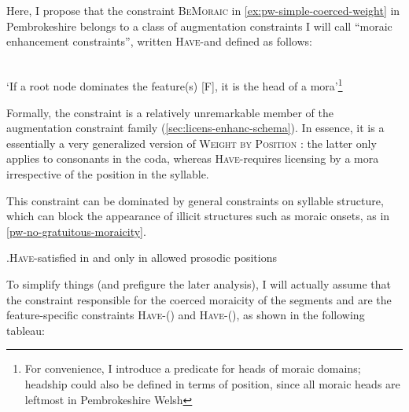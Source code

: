 Here, I propose that the constraint \textsc{BeMoraic} in \cref{ex:pw-simple-coerced-weight} in Pembrokeshire belongs to a class of augmentation constraints I will call \enquote{moraic enhancement constraints}, written \textsc{Have}-\mo[F] and defined as follows:

\begin{constraint}
  \label{def:have-m}
  \\
  `If a root node dominates the feature(s) [F], it is the head of a mora'\footnote{For convenience, I introduce a predicate for heads of moraic domains; headship could also be defined in terms of position, since all moraic heads are leftmost in Pembrokeshire Welsh}
\end{constraint}


Formally, the constraint is a relatively unremarkable member of the augmentation constraint family (\cref{sec:licens-enhanc-schema}). In essence, it is a essentially a very generalized version of \textsc{Weight by Position} \citep{hayes89:_compen_lengt_moraic_phonol,goldsmith90:_autos,archangeli91:_syllab_yawel,zec95,broselow97:_syllab,rosenthall99:_weigh_posit_posit,moren01:_distin}: the latter only applies to consonants in the coda, whereas \textsc{Have}-\mo requires licensing by a mora irrespective of the position in the syllable.

This constraint can be dominated by general constraints on syllable structure, which can block the appearance of illicit structures such as moraic onsets, as in \ref{pw-no-gratuitous-moraicity}.

\ex.\label{pw-no-gratuitous-moraicity}\textsc{Have}-\mo[C] satisfied in and only in allowed prosodic positions\\
\begin{OTtableau}{3}
\end{OTtableau}

To simplify things (and prefigure the later analysis), I will actually assume that the constraint responsible for the coerced moraicity of the segments \ipa{[m]} and \ipa{[ŋ]} are the feature\hyp specific constraints \textsc{Have}-\mo() and \textsc{Have}-\mo(), as shown in the following tableau:

